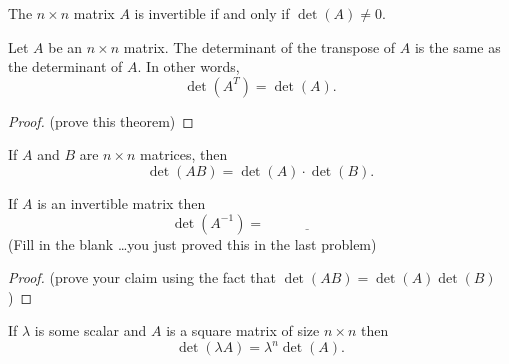 \begin{thm}
    The $n \times n$ matrix $A$ is invertible if and only if $\det(A) \ne 0$.
\end{thm}

\begin{thm}
    Let $A$ be an $n \times n$ matrix.  The determinant of the transpose of $A$ is the
    same as the determinant of $A$.  In other words,
    \[ \det(A^T) = \det(A). \]
\end{thm}
\begin{proof}
    (prove this theorem)
\end{proof}

\begin{thm}
    If $A$ and $B$ are $n \times n$ matrices, then
    \[ \det(AB) = \det(A) \cdot \det(B). \]
\end{thm}

% 

% 
% 
%             

\begin{thm}
    If $A$ is an invertible matrix then \[ \det(A^{-1}) = \underline{\hspace{1in}} \] (Fill
    in the blank \ldots you just proved this in the last problem)
\end{thm}
\begin{proof}
    (prove your claim using the fact that $\det(AB) = \det(A)\det(B)$)
\end{proof}

\begin{thm}
    If $\lambda$ is some scalar and $A$ is a square matrix of size $n \times n$ then
    \[ \det(\lambda A) = \lambda^n \det(A). \]
\end{thm}


